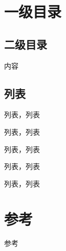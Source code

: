 \section{一级目录}
\subsection{二级目录}
内容
\subsection{列表}
\begin{denselist}[]
\item {列表，列表}
\item {列表，列表}
\item {列表，列表}
\item {列表，列表}
\item {列表，列表}
\end{denselist}

\section{参考}
参考
